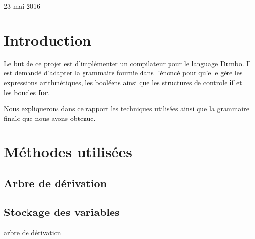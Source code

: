 \documentclass[a4paper,10pt]{article}
\begin{document}
\begin{titlepage}

{\large 23 mai 2016}\\[3cm] %


 

\vfill %

\end{titlepage}

\newpage
\tableofcontents
\newpage

\section{Introduction}
Le but de ce projet est d'implémenter un compilateur pour le language \textrm{Dumbo}. Il est demandé d'adapter la grammaire fournie dans l'énoncé pour qu'elle gère les 
expressions arithmétiques, les booléens ainsi que les structures de controle \textbf{if} et les boucles \textbf{for}.

Nous expliquerons dans ce rapport les techniques utilisées ainsi que la grammaire finale que nous avons obtenue.

\section{Méthodes utilisées}
\subsection{Arbre de dérivation}

\subsection{Stockage des variables}
arbre de dérivation 
\end{document}

